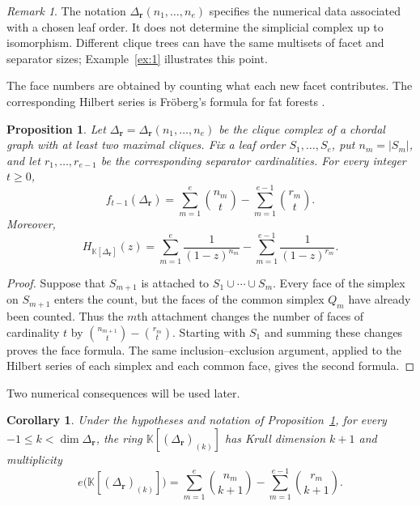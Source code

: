 \documentclass[11pt]{amsart}
\newtheorem{proposition}[theorem]{Proposition}
\newtheorem{corollary}[theorem]{Corollary}
\theoremstyle{definition}
\theoremstyle{remark}
\newtheorem{remark}[theorem]{Remark}
\newcommand{\K}{\mathbb K}
\newcommand{\SR}[1]{\K[#1]}
\begin{document}
	\begin{remark}\label{rem:1}
		The notation $\Delta_{\mathbf r}(n_1,\ldots,n_e)$ specifies the numerical data associated with a chosen leaf order. It does not determine the simplicial complex up to isomorphism. Different clique trees can have the same multisets of facet and separator sizes; Example~\ref{ex:1} illustrates this point.
	\end{remark}
	
	The face numbers are obtained by counting what each new facet contributes. The corresponding Hilbert series is Fr\"oberg's formula for fat forests \cite{Fr1}.
	
	\begin{proposition}\label{prop:2}
		Let $\Delta_{\mathbf r}=\Delta_{\mathbf r}(n_1,\ldots,n_e)$ be the clique complex of a chordal graph with at least two maximal cliques. Fix a leaf order $S_1,\ldots,S_e$, put $n_m=|S_m|$, and let $r_1,\ldots,r_{e-1}$ be the corresponding separator cardinalities. For every integer $t\ge0$,
		\[
		f_{t-1}(\Delta_{\mathbf r})
		=
		\sum_{m=1}^e\binom{n_m}{t}
		-
		\sum_{m=1}^{e-1}\binom{r_m}{t}.
		\]
		Moreover,
		\[
		H_{\SR{\Delta_{\mathbf r}}}(z)
		=
		\sum_{m=1}^e\frac{1}{(1-z)^{n_m}}
		-
		\sum_{m=1}^{e-1}\frac{1}{(1-z)^{r_m}}.
		\]
	\end{proposition}
	
	\begin{proof}
		Suppose that $S_{m+1}$ is attached to $S_1\cup\cdots\cup S_m$. Every face of the simplex on $S_{m+1}$ enters the count, but the faces of the common simplex $Q_m$ have already been counted. Thus the $m$th attachment changes the number of faces of cardinality $t$ by $\binom{n_{m+1}}t-\binom{r_m}t$. Starting with $S_1$ and summing these changes proves the face formula. The same inclusion--exclusion argument, applied to the Hilbert series of each simplex and each common face, gives the second formula.
	\end{proof}
	
	Two numerical consequences will be used later.
	
	\begin{corollary}\label{cor:1}
		Under the hypotheses and notation of Proposition~\ref{prop:2}, for every $-1\le k<\dim\Delta_{\mathbf r}$, the ring $\SR{(\Delta_{\mathbf r})_{(k)}}$ has Krull dimension $k+1$ and multiplicity
		\[
		e\bigl(\SR{(\Delta_{\mathbf r})_{(k)}}\bigr)
		=
		\sum_{m=1}^e\binom{n_m}{k+1}
		-
		\sum_{m=1}^{e-1}\binom{r_m}{k+1}.
		\]
	\end{corollary}
	
\end{document}
